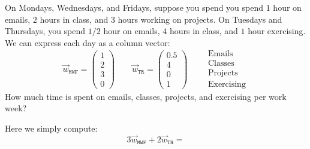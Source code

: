 \documentclass{ximera}
\begin{document}
\begin{example}
  On Mondays, Wednesdays, and Fridays, suppose you spend you spend $1$
  hour on emails, $2$ hours in class, and $3$ hours working on
  projects. On Tuesdays and Thursdays, you spend $1/2$ hour on emails,
  $4$ hours in class, and $1$ hour exercising. We can express each day
  as a column vector:
  \[
  \vec{w}_{\texttt{MWF}} =
  \begin{pmatrix}
    1 \\
    2 \\
    3 \\
    0
  \end{pmatrix}
  \qquad
  \vec{w}_{\texttt{TR}} =
  \begin{pmatrix}
    0.5\\
    4\\
    0\\
    1
  \end{pmatrix} \qquad
  \begin{array}{l}
    \text{Emails}\\
    \text{Classes}\\
    \text{Projects}\\
    \text{Exercising}
  \end{array}
  \]
  How much time is spent on emails, classes, projects, and exercising
  per work week?
  \begin{solution}
    Here we simply compute:
    \[
    3 \vec{w}_{\texttt{MWF}} + 2  \vec{w}_{\texttt{TR}}  =
    \]
  \end{solution}
\end{example}
\end{document}
